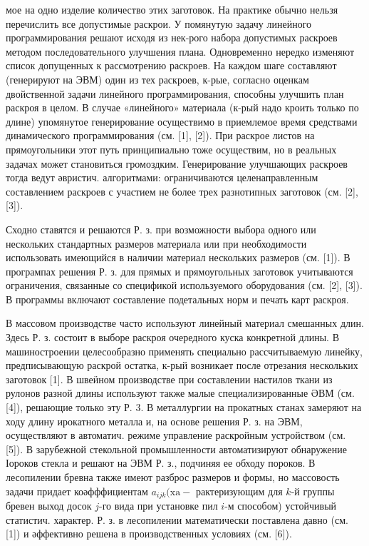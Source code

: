 \documentclass[10pt]{article}
\begin{document}
мое на одно изделие количество этих заготовок. На практике обычно нельзя перечислить все допустимые раскрои. У помянутую задачу линеӥного программирования решают исходя из нек-рого набора допустимых раскроев методом последовательного улучшения плана. Одновременно нередко изменяют список допущенных к рассмотрению раскроев. На каждом шаге составляют (генерируют на ЭВМ) один из тех раскроев, к-рые, согласно оценкам двойственной задачи линейного программирования, способны улучшить план раскроя в целом. В случае «линейного» материала (к-рый надо кроить только по длине) упомянутое генерирование осуществимо в приемлемое время средствами динамического программирования (см. [1], [2]). При раскрое листов на прямоугольники этот путь принципиально тоже осуществим, но в реальных задачах может становиться громоздким. Генерирование улучшающих раскроев тогда ведут әвристич. алгоритмами: ограничиваются целенаправленным составлением раскроев с участием не более трех разнотипных заготовок (см. [2], [3]).



Сходно ставятся и решаются Р. з. при возможности выбора одного или нескольких стандартных размеров материала или при необходимости использовать имеющийся в наличии материал нескольких размеров (см. [1]). В програмпах решения Р. з. для прямых и прямоугольных заготовок учитываются ограничения, связанные со спецификой используемого оборудования (см. [2], [3]). В программы включают составление подетальных норм и печать карт раскроя.



В массовом производстве часто используют линейный материал смешанных длин. Здесь Р. з. состоит в выборе раскроя очередного куска конкретной длины. В машиностроении целесообразно применять специально рассчитываемую линейку, предписывающую раскрой остатка, к-рый возникает после отрезания нескольких заготовок [1]. В швеӥном производстве при составлении настилов ткани из рулонов разной длины используют также малые специализированные ӘВМ (см. [4]), решающие только эту Р. 3. В металлургии на прокатных станах замеряют на ходу длину ирокатного металла и, на основе решения Р. з. на ЭВМ, осуществляют в автоматич. режиме управление раскройным устройством (см. [5]). В зарубежной стекольной промышленности автоматизируют обнаружение Іороков стекла и решают на ЭВМ Р. з., подчиняя ее обходу пороков. В лесопилении бревна также имеют разброс размеров и формы, но массовость задачи придает коәфффициентам $a_{i j k}(\mathrm{xa}-$ рактеризующим для $k$-й группы бревен выход досок $j$-го вида при установке пил $i$-м способом) устойчивый статистич. характер. Р. з. в лесопилении математически поставлена давно (см. [1]) и әффективно решена в производственных условиях (см. [6]).
\end{document}

